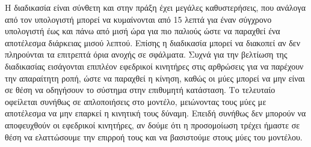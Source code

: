 Η διαδικασία είναι σύνθετη και στην πράξη έχει μεγάλες καθυστερήσεις, που ανάλογα από τον υπολογιστή μπορεί να κυμαίνονται από 15 λεπτά για έναν σύγχρονο υπολογιστή έως και πάνω από μισή ώρα για πιο παλιούς ώστε να παραχθεί ένα αποτέλεσμα διάρκειας μισού λεπτού. Επίσης η διαδικασία μπορεί να διακοπεί αν δεν πληρούνται τα επιτρεπτά όρια ανοχής σε σφάλματα. Συχνά για την βελτίωση της διαδικασίας εισάγονται επιπλέον εφεδρικοί κινητήρες στις αρθρώσεις για να παρέχουν την απαραίτητη ροπή, ώστε να παραχθεί η κίνηση, καθώς οι μύες μπορεί να μην είναι σε θέση να οδηγήσουν το σύστημα στην επιθυμητή κατάσταση. Το τελευταίο οφείλεται συνήθως σε απλοποιήσεις στο μοντέλο, μειώνοντας τους μύες με αποτέλεσμα να μην επαρκεί η κινητική τους δύναμη. Επειδή συνήθως δεν μπορούν να αποφευχθούν οι εφεδρικοί κινητήρες, αν δούμε ότι η προσομοίωση τρέχει ήμαστε σε θέση να ελαττώσουμε την επιρροή τους και να βασιστούμε στους μύες του μοντέλου.


